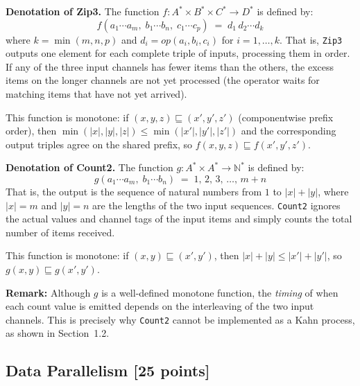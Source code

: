 \documentclass[11pt]{article}
\newcommand{\mnt}[1]{{\small\texttt{#1}}}
\theoremstyle{definition}
\newcommand{\N}{\mathbb{N}}
\newcommand{\kstar}{^{\textstyle *}}
\begin{document}
\textbf{Denotation of Zip3.} The function $f: A\kstar \times B\kstar \times C\kstar \to D\kstar$ is defined by:
\[
	f(a_1 \cdots a_m,\; b_1 \cdots b_n,\; c_1 \cdots c_p) \;=\; d_1 \, d_2 \cdots d_k
\]
where $k = \min(m, n, p)$ and $d_i = \mathit{op}(a_i, b_i, c_i)$ for $i = 1, \ldots, k$. That is, \mnt{Zip3} outputs one element for each complete triple of inputs, processing them in order. If any of the three input channels has fewer items than the others, the excess items on the longer channels are not yet processed (the operator waits for matching items that have not yet arrived).

This function is monotone: if $(x, y, z) \sqsubseteq (x', y', z')$ (componentwise prefix order), then $\min(|x|, |y|, |z|) \leq \min(|x'|, |y'|, |z'|)$ and the corresponding output triples agree on the shared prefix, so $f(x,y,z) \sqsubseteq f(x',y',z')$.

\medskip

\textbf{Denotation of Count2.} The function $g: A\kstar \times A\kstar \to \N\kstar$ is defined by:
\[
	g(a_1 \cdots a_m,\; b_1 \cdots b_n) \;=\; 1,\, 2,\, 3,\, \ldots,\, m + n
\]
That is, the output is the sequence of natural numbers from $1$ to $|x| + |y|$, where $|x| = m$ and $|y| = n$ are the lengths of the two input sequences. \mnt{Count2} ignores the actual values and channel tags of the input items and simply counts the total number of items received.

This function is monotone: if $(x, y) \sqsubseteq (x', y')$, then $|x| + |y| \leq |x'| + |y'|$, so $g(x,y) \sqsubseteq g(x',y')$.

\textbf{Remark:} Although $g$ is a well-defined monotone function, the \emph{timing} of when each count value is emitted depends on the interleaving of the two input channels. This is precisely why \mnt{Count2} cannot be implemented as a Kahn process, as shown in Section~1.2.

\clearpage %
\subsection{Data Parallelism [25 points]}
\end{document}

